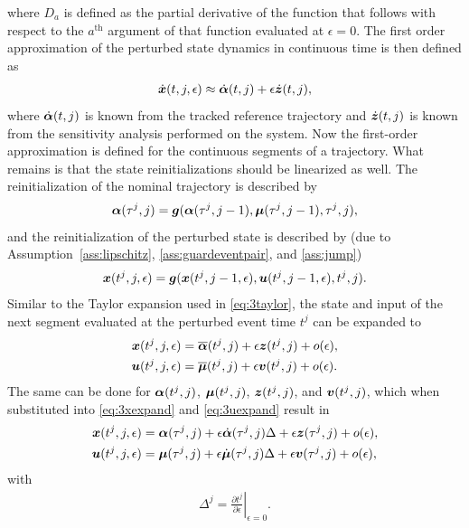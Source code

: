 \documentclass[../DC2017114Bouma.tex]{subfiles}
\begin{document}
where $D_a$ is defined as the partial derivative of the function that follows with respect to the $a^{\text{th}}$ argument of that function evaluated at $\epsilon = 0$. The first order approximation of the perturbed state dynamics in continuous time is then defined as
\begin{align}
\dot{{\boldsymbol{x}}}(t,j,\epsilon) \approx \dot{\boldsymbol{\alpha}}(t,j) + \epsilon\dot{{\boldsymbol{z}}}(t,j),
\end{align}
where $\dot{\boldsymbol{\alpha}}(t,j)$ is known from the tracked reference trajectory and $\dot{{\boldsymbol{z}}}(t,j)$ is known from the sensitivity analysis performed on the system. Now the first-order approximation is defined for the continuous segments of a trajectory. What remains is that the state reinitializations should be linearized as well. The reinitialization of the nominal trajectory is described by
\begin{align}
\boldsymbol{\alpha}(\tau^j,j) = {\boldsymbol{g}}(\boldsymbol{\alpha}(\tau^j,j-1),\boldsymbol{\mu}(\tau^j,j-1),\tau^j,j),\label{eq:3g}
\end{align}
and the reinitialization of the perturbed state is described by (due to Assumption~\ref{ass:lipschitz}, \ref{ass:guardeventpair}, and \ref{ass:jump})
\begin{align}
{\boldsymbol{x}}(t^{j},j,\epsilon) = {\boldsymbol{g}}({\boldsymbol{x}}(t^{j},j-1,\epsilon),{\boldsymbol{u}}(t^{j},j-1,\epsilon),t^{j},j).
\end{align}
Similar to the Taylor expansion used in \eqref{eq:3taylor}, the state and input of the next segment evaluated at the perturbed event time $t^{j}$ can be expanded to
\begin{align}
{\boldsymbol{x}}(t^{j},j,\epsilon) &= \overline{\boldsymbol{\alpha}}(t^{j},j) + \epsilon{\boldsymbol{z}}(t^{j},j) + o(\epsilon),\label{eq:3xexpand}\\
{\boldsymbol{u}}(t^{j},j,\epsilon) &= \overline{\boldsymbol{\mu}}(t^{j},j) + \epsilon{\boldsymbol{v}}(t^{j},j) + o(\epsilon).\label{eq:3uexpand}
\end{align}
The same can be done for $\boldsymbol{\alpha}(t^{j},j)$, $\boldsymbol{\mu}(t^{j},j)$, ${\boldsymbol{z}}(t^{j},j)$, and ${\boldsymbol{v}}(t^{j},j)$, which when substituted into \eqref{eq:3xexpand} and \eqref{eq:3uexpand} result in
\begin{align}
{\boldsymbol{x}}(t^{j},j,\epsilon) &= \boldsymbol{\alpha}(\tau^j,j) + \epsilon\dot{\boldsymbol{\alpha}}(\tau^j,j)\Delta + \epsilon{\boldsymbol{z}}(\tau^j,j) + o(\epsilon),\label{eq:3xexpand2}\\
{\boldsymbol{u}}(t^{j},j,\epsilon) &= \boldsymbol{\mu}(\tau^j,j) + \epsilon\dot{\boldsymbol{\mu}}(\tau^j,j)\Delta + \epsilon{\boldsymbol{v}}(\tau^j,j) + o(\epsilon),\label{eq:3uexpand2}
\end{align}
with
\begin{align}
\Delta^{j} = \left.\frac{\partial t^{j}}{\partial\epsilon}\right|_{\epsilon=0}.\label{eq:3Delta}
\end{align}
\end{document}
